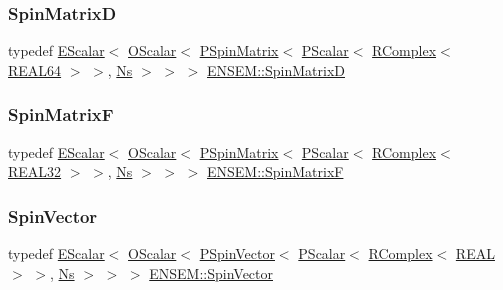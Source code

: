 \mbox{\label{group__defs_ga9a03c1e03f1df3df33fe8cf7f4a8786f}} 
\subsubsection{\texorpdfstring{SpinMatrixD}{SpinMatrixD}}
{\footnotesize\ttfamily typedef \mbox{\hyperlink{classENSEM_1_1EScalar}{E\+Scalar}}$<$ \mbox{\hyperlink{classENSEM_1_1OScalar}{O\+Scalar}}$<$ \mbox{\hyperlink{classENSEM_1_1PSpinMatrix}{P\+Spin\+Matrix}}$<$ \mbox{\hyperlink{classENSEM_1_1PScalar}{P\+Scalar}}$<$ \mbox{\hyperlink{classENSEM_1_1RComplex}{R\+Complex}}$<$ \mbox{\hyperlink{namespaceENSEM_a85b215b9f1f43715aebee01718e25082}{R\+E\+A\+L64}} $>$ $>$, \mbox{\hyperlink{namespaceENSEM_a6f05e048f9b2eb1a19131074f8abc25f}{Ns}} $>$ $>$ $>$ \mbox{\hyperlink{group__defs_ga9a03c1e03f1df3df33fe8cf7f4a8786f}{E\+N\+S\+E\+M\+::\+Spin\+MatrixD}}}

\mbox{\label{group__defs_ga9332913187b2b1a824c75f7c9cafd4d3}} 
\subsubsection{\texorpdfstring{SpinMatrixF}{SpinMatrixF}}
{\footnotesize\ttfamily typedef \mbox{\hyperlink{classENSEM_1_1EScalar}{E\+Scalar}}$<$ \mbox{\hyperlink{classENSEM_1_1OScalar}{O\+Scalar}}$<$ \mbox{\hyperlink{classENSEM_1_1PSpinMatrix}{P\+Spin\+Matrix}}$<$ \mbox{\hyperlink{classENSEM_1_1PScalar}{P\+Scalar}}$<$ \mbox{\hyperlink{classENSEM_1_1RComplex}{R\+Complex}}$<$ \mbox{\hyperlink{namespaceENSEM_a7540d01191172323e9073283d772576d}{R\+E\+A\+L32}} $>$ $>$, \mbox{\hyperlink{namespaceENSEM_a6f05e048f9b2eb1a19131074f8abc25f}{Ns}} $>$ $>$ $>$ \mbox{\hyperlink{group__defs_ga9332913187b2b1a824c75f7c9cafd4d3}{E\+N\+S\+E\+M\+::\+Spin\+MatrixF}}}

\mbox{\label{group__defs_ga4cb5c4207c68050d0bd3e3e2d614bc78}} 
\subsubsection{\texorpdfstring{SpinVector}{SpinVector}}
{\footnotesize\ttfamily typedef \mbox{\hyperlink{classENSEM_1_1EScalar}{E\+Scalar}}$<$ \mbox{\hyperlink{classENSEM_1_1OScalar}{O\+Scalar}}$<$ \mbox{\hyperlink{classENSEM_1_1PSpinVector}{P\+Spin\+Vector}}$<$ \mbox{\hyperlink{classENSEM_1_1PScalar}{P\+Scalar}}$<$ \mbox{\hyperlink{classENSEM_1_1RComplex}{R\+Complex}}$<$ \mbox{\hyperlink{namespaceENSEM_a6dd9aa6508168f545c861787e63ddd1e}{R\+E\+AL}} $>$ $>$, \mbox{\hyperlink{namespaceENSEM_a6f05e048f9b2eb1a19131074f8abc25f}{Ns}} $>$ $>$ $>$ \mbox{\hyperlink{group__defs_ga4cb5c4207c68050d0bd3e3e2d614bc78}{E\+N\+S\+E\+M\+::\+Spin\+Vector}}}

